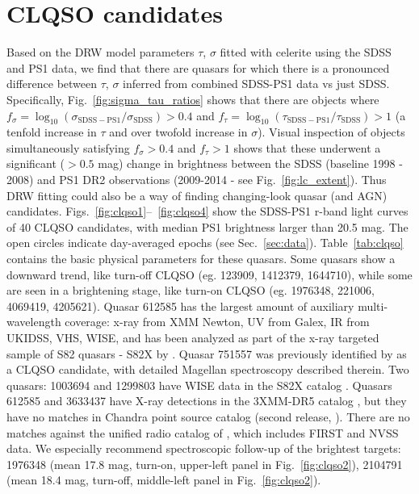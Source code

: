 \documentclass[twocolumn]{aastex62}
\newcommand{\project}[1]{\textsf{#1}}
\begin{document}
\section{CLQSO candidates}
\label{app:clqso_cands}

Based on the DRW model  parameters $\tau$, $\sigma$ fitted with \project{celerite} using the SDSS and PS1 data, we find that there are quasars for which there is a pronounced difference between $\tau$, $\sigma$  inferred from combined SDSS-PS1 data vs just SDSS. Specifically, Fig.~\ref{fig:sigma_tau_ratios} shows that there are objects where $f_{\sigma} = \log_{10}{\left( \sigma_{\mathrm{SDSS-PS1}} / \sigma_{\mathrm{SDSS}} \right)} > 0.4 $ and $f_{\tau} = \log_{10}{\left( \tau_{\mathrm{SDSS-PS1}} / \tau_{\mathrm{SDSS}} \right)} > 1$ (a tenfold increase in $\tau$ and over twofold increase in $\sigma$). Visual inspection of objects simultaneously satisfying $f_{\sigma}> 0.4$ and $f_{\tau}> 1 $ shows that these underwent a significant ($>0.5$ mag) change in brightness between the SDSS (baseline 1998 - 2008) and PS1 DR2 observations (2009-2014 - see Fig.~\ref{fig:lc_extent}). Thus DRW fitting could also be a way of finding changing-look quasar (and AGN) candidates. Figs.~\ref{fig:clqso1}--~\ref{fig:clqso4} show the SDSS-PS1 r-band light curves of 40 CLQSO candidates, with median PS1 brightness larger  than 20.5 mag. The open circles indicate day-averaged epochs (see Sec.~\ref{sec:data}). Table~\ref{tab:clqso} contains the basic physical parameters for these quasars. Some quasars show a downward trend, like turn-off CLQSO (eg. 123909, 1412379,  1644710), while some are seen in a brightening stage, like turn-on CLQSO (eg. 1976348, 221006, 4069419, 4205621). Quasar 612585 has the largest amount of auxiliary multi-wavelength coverage: x-ray from XMM Newton, UV from Galex, IR from UKIDSS, VHS, WISE, and has been analyzed as part of the x-ray targeted sample of S82 quasars - S82X by \cite{lamassa2016a}. Quasar 751557 was previously identified by \cite{macleod2019} as a CLQSO candidate, with detailed Magellan spectroscopy described therein.  Two quasars: 1003694 and 1299803 have WISE data in the S82X catalog \citep{lamassa2016a}. Quasars 612585 and 3633437 have X-ray detections in the 3XMM-DR5 catalog \citep{rosen2016}, but they have no matches in Chandra point source catalog (second release, \citealt{evans2010, evans2018}). There are no matches against the unified radio catalog of \cite{kimball2008}, which includes FIRST and NVSS data. We especially recommend spectroscopic follow-up of the brightest targets: 1976348 (mean 17.8 mag, turn-on, upper-left panel in Fig.~\ref{fig:clqso2}), 2104791 (mean 18.4 mag, turn-off, middle-left panel in Fig.~\ref{fig:clqso2}).
\end{document}
